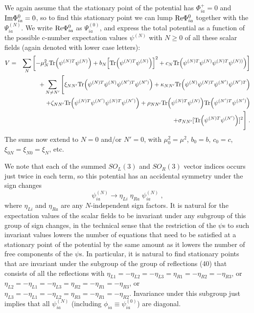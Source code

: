 \documentclass[12pt]{article}
\begin{document}
We again assume that the stationary point of the potential has $\Phi^+_{ia}=0$ and ${\rm Im}\Phi^0_{ia}=0$, so to find this stationary point we can lump ${\rm Re}\Phi^0_{ia}$ together with the $\Psi^{(N)}_{ia}$.  We write ${\rm Re}\Phi^0_{ia}$ as $\Psi_{ia}^{(0)}$, and express the total potential as a function of the  possible c-number expectation values $\psi^{(N)}$ with $N\geq 0$ of all these  scalar fields (again denoted with lower case letters):
\begin{eqnarray}
V=&&\sum_N\left[-\mu_N^2{\rm Tr}\Big(\psi^{(N)T}\psi^{(N)}\Big)+b_N\Big[{\rm Tr}\Big(\psi^{(N)T}\psi^{(N)}\Big)\Big]^2+c_N{\rm Tr}\Big(\psi^{(N)T}\psi^{(N)}\psi^{(N)T}\psi^{(N))}\Big)\right]\nonumber\\&&
+\sum_{N\neq N'}\Bigg[\xi_{NN'} {\rm Tr}\Big(\psi^{(N)T}\psi^{(N)}\psi^{(N')T}\psi^{(N')}\Big)+\kappa_{N N'}{\rm Tr}\Big(\psi^{(N)}\psi^{(N)T}\psi^{(N')}\psi^{(N')T}\Big)\nonumber\\&&
+\zeta_{N N'} {\rm Tr}\Big(\psi^{(N)T}\psi^{(N')}\psi^{(N)T}\psi^{(N')}\Big)
+\rho_{N N'} {\rm Tr}\Big(\psi^{(N)T}\psi^{(N)}\Big){\rm Tr}\Big(\psi^{(N')T}\psi^{(N')}\Big)\nonumber\\&&+\sigma_{N N'} [{\rm Tr}\Big(\psi^{(N)T}\psi^{(N')}\Big)]^2\Bigg]\;.
\end{eqnarray}
The sums now extend to $N=0$ and/or $N'=0$, with $\mu_0^2=\mu^2$, $b_0=b$, $c_0=c$, $\xi_{0N}=\xi_{N0}=\xi_N$, etc.

We note that each of the summed $SO_L(3)$ and $SO_R(3)$ vector indices occurs just twice in each term, so this potential has an 
accidental symmetry under the sign changes
\begin{equation}
\psi^{(N)}_{ia}\rightarrow \eta_{Li}\;\eta_{Ra}\;\psi^{(N)}_{ia}\;,
\end{equation}
where $\eta_{Li}$ and $\eta_{Ra}$ are any $N$-independent sign factors.  It is natural for the expectation values of the scalar fields to be invariant under any subgroup of this group of sign changes, in the technical sense that the restriction of the $\psi$s to such invariant values lowers the number of equations that need to be satisfied at a stationary point of the potential by the same amount as it lowers the number of free components of the $\psi$s.  In particular, it is natural to find stationary points that are invariant under the subgroup of the group of reflections (40) that consists of all the reflections with $
\eta_{L1}=-\eta_{L2}=-\eta_{L3}=\eta_{R1}=-\eta_{R2}=-\eta_{R3}$, or $\eta_{L2}=-\eta_{L1}=-\eta_{L3}=\eta_{R2}=-\eta_{R1}=-\eta_{R3}$, or $\eta_{L3}=-\eta_{L1}=-\eta_{L2}=\eta_{R3}=-\eta_{R1}=-\eta_{R2}$.  Invariance under this subgroup just implies that all $\psi^{(N)}_{ia}$ (including $\phi_{ia}\equiv \psi_{ia}^{(0)}$) are diagonal.   
\end{document}
